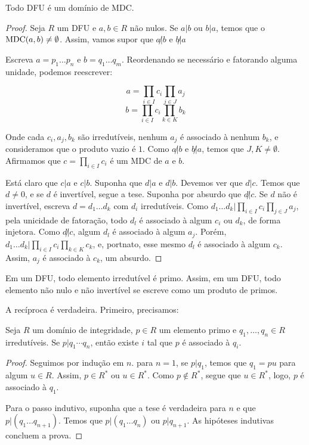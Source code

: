 \begin{prop}
    Todo DFU é um domínio de MDC.
\end{prop}
\begin{proof}
Seja $R$ um DFU e $a, b \in R$ não nulos.
Se $a|b$ ou $b|a$, temos que o $\operatorname{MDC}(a, b)\neq \emptyset$.
Assim, vamos supor que $a\not|b$ e $b\not|a$

Escreva $a=p_1\dots p_n$ e $b=q_1\dots q_m$.
Reordenando se necessário e fatorando alguma unidade, podemos reescrever:

\[a=\prod_{i \in I} c_i \prod_{j \in J} a_j\]
\[b=\prod_{i \in I} c_i \prod_{k \in K} b_k\]

Onde cada $c_i, a_j, b_k$ são irredutíveis, nenhum $a_j$ é associado à nenhum $b_k$, e consideramos que o produto vazio é $1$.
Como $a\not |b$ e $b\not | a$, temos que $J, K\neq\emptyset$.
Afirmamos que $c=\prod_{i \in I} c_i$ é um MDC de $a$ e $b$.

Está claro que $c|a$ e $c|b$.
Suponha que $d|a$ e $d|b$.
Devemos ver que $d|c$.
Temos que $d\neq 0$, e se $d$ é invertível, segue a tese.
Suponha por absurdo que $d\not | c$.
Se $d$ não é invertível, escreva $d=d_1\dots d_k$ com $d_i$ irredutíveis.
Como $d_1\dots d_k|\prod_{i \in I} c_i \prod_{j \in J} a_j$, pela unicidade de fatoração, todo $d_l$ é associado à algum $c_i$ ou $d_k$, de forma injetora.
Como $d\not |c$, algum $d_l$ é associado à algum $a_j$.
Porém, $d_1\dots d_k|\prod_{i \in I} c_i \prod_{k \in K} c_k$, e, portnato, esse mesmo $d_l$ é associado à algum $c_k$.
Assim, $a_j$ é associado à $c_k$, um absurdo.
\end{proof}

\begin{corol}
Em um DFU, todo elemento irredutível é primo.
Assim, em um DFU, todo elemento não nulo e não invertível se escreve como um produto de primos.
\end{corol}

A recíproca é verdadeira. Primeiro, precisamos:

\begin{lemma}
Seja $R$ um domínio de integridade, $p\in R$ um elemento primo e $q_1, \dots, q_n\in R$ irredutíveis.
Se $p|q_1\cdots q_n$, então existe $i$ tal que $p$ é associado à $q_i$.
\end{lemma}
\begin{proof}
Seguimos por indução em $n$.
para $n=1$, se $p|q_1$, temos que $q_1=pu$ para algum $u\in R$.
Assim, $p\in R^*$ ou $u\in R^*$.
Como $p \notin R^*$, segue que $u \in R^*$, logo, $p$ é associado à $q_1$.

Para o passo indutivo, suponha que a tese é verdadeira para $n$ e que $p|(q_1\dots q_{n+1})$.
Temos que $p|(q_1\dots q_{n})$ ou $p|q_{n+1}$.
As hipóteses indutivas concluem a prova.
\end{proof}

